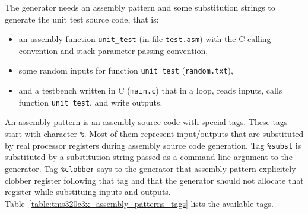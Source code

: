 The generator needs an assembly pattern and some substitution strings to generate the unit test source code, that is:
\begin{itemize}
\item an assembly function \texttt{unit\_test} (in file \texttt{test.asm}) with the C calling convention and stack parameter passing convention,
\item some random inputs for function \texttt{unit\_test} (\texttt{random.txt}),
\item and a testbench written in C (\texttt{main.c}) that in a loop, reads inputs, calls function \texttt{unit\_test}, and write outputs.
\end{itemize}

An assembly pattern is an assembly source code with special tags. 
These tags start with character \texttt{\%}. 
Most of them represent input/outputs that are substituted by real processor registers during assembly source code generation. 
Tag \texttt{\%subst} is substituted by a substitution string passed as a command line argument to the generator.
Tag \texttt{\%clobber} says to the generator that assembly pattern explicitely clobber register following that tag and that the generator should not allocate that register while substituing inputs and outputs.
Table~\ref{table:tms320c3x_assembly_patterns_tags} lists the available tags.

